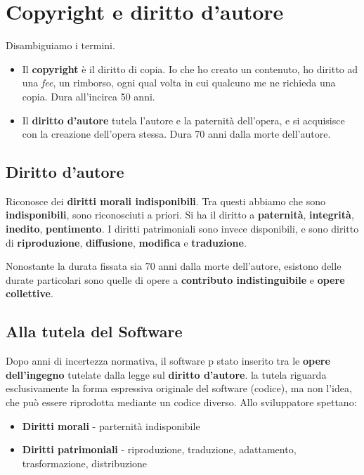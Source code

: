\section{Copyright e diritto d'autore}

Disambiguiamo i termini.
\begin{itemize}
	\item Il \textbf{copyright} è il diritto di copia. Io che ho creato un contenuto, ho diritto ad una \textit{fee}, un rimborso, ogni qual volta in cui qualcuno me ne richieda una copia. Dura all'incirca 50 anni.
	\item Il \textbf{diritto d'autore} tutela l'autore e la paternità dell'opera, e si acquisisce con la creazione dell'opera stessa. Dura 70 anni dalla morte dell'autore.
\end{itemize}

\subsection{Diritto d'autore}
Riconosce dei \textbf{diritti morali indisponibili}. Tra questi abbiamo che sono \textbf{indisponibili}, sono riconosciuti a priori. Si ha il diritto a \textbf{paternità}, \textbf{integrità}, \textbf{inedito}, \textbf{pentimento}. I diritti patrimoniali sono invece disponibili, e sono diritto di \textbf{riproduzione}, \textbf{diffusione}, \textbf{modifica} e \textbf{traduzione}.

Nonostante la durata fissata sia 70 anni dalla morte dell'autore, esistono delle durate particolari sono quelle di opere a \textbf{contributo indistinguibile} e \textbf{opere collettive}.

\subsection{Alla tutela del Software}
Dopo anni di incertezza normativa, il software p stato inserito tra le \textbf{opere dell'ingegno} tutelate dalla legge sul \textbf{diritto d'autore}. la tutela riguarda esclusivamente la forma espressiva originale del software (codice), ma non l'idea, che può essere riprodotta mediante un codice diverso. Allo sviluppatore spettano:

\begin{itemize}
	\item \textbf{Diritti morali} - parternità indisponibile
	\item \textbf{Diritti patrimoniali} - riproduzione, traduzione, adattamento, trasformazione, distribuzione
\end{itemize}


